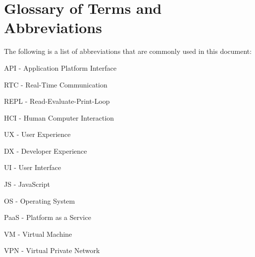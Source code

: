 \section{Glossary of Terms and Abbreviations}
The following is a list of abbreviations that are commonly used in this document:

API - Application Platform Interface

RTC - Real-Time Communication

REPL - Read-Evaluate-Print-Loop

HCI - Human Computer Interaction

UX - User Experience

DX - Developer Experience

UI - User Interface

JS - JavaScript

OS - Operating System

PaaS - Platform as a Service

VM - Virtual Machine

VPN - Virtual Private Network
\pagebreak
